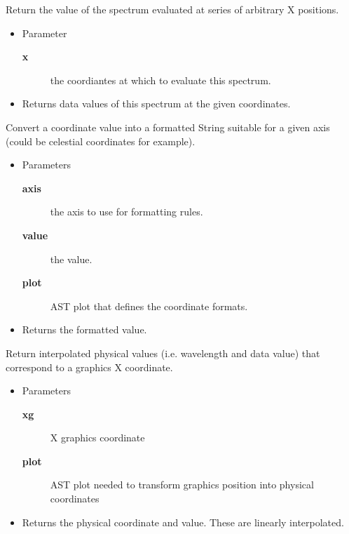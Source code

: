 \begin{desc}Return the value of the spectrum evaluated at series of
 arbitrary X positions.
\begin{itemize}
\item{Parameter
  \begin{description}
   \item[\textbf{x}]{the coordiantes at which to evaluate this spectrum.}
  \end{description}}
\end{itemize}
\begin{itemize}
\item{Returns data values of this spectrum at the given coordinates. }
\end{itemize}
\end{desc}

\begin{desc}Convert a coordinate value into a formatted String suitable for
 a given axis (could be celestial coordinates for example).
\begin{itemize}
\item{Parameters
  \begin{description}
   \item[\textbf{axis}]{the axis to use for formatting rules.}
   \item[\textbf{value}]{the value.}
   \item[\textbf{plot}]{AST plot that defines the coordinate formats.}
  \end{description}}
\end{itemize}
\begin{itemize}
\item{Returns the formatted value. }
\end{itemize}
\end{desc}

\begin{desc}Return interpolated physical values (i.e. wavelength and data
 value) that correspond to a graphics X coordinate.
\begin{itemize}
\item{Parameters
  \begin{description}
   \item[\textbf{xg}]{X graphics coordinate}
   \item[\textbf{plot}]{AST plot needed to transform graphics position
            into physical coordinates}
  \end{description}}
\end{itemize}
\begin{itemize}
\item{Returns the physical coordinate and value. These are
 linearly interpolated. }
\end{itemize}
\end{desc}

